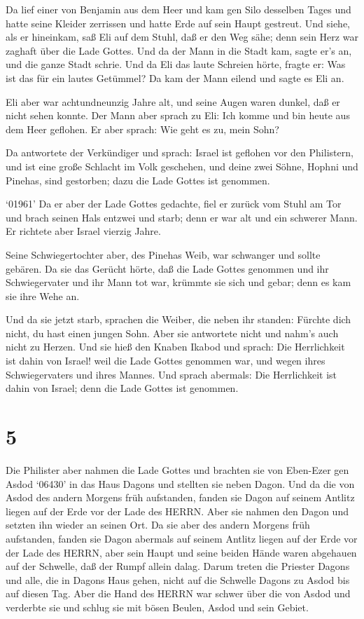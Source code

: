  Da lief einer von Benjamin aus dem Heer und kam gen Silo
desselben Tages und hatte seine Kleider zerrissen und hatte Erde auf
sein Haupt gestreut.  Und siehe, als er hineinkam, saß Eli
auf dem Stuhl, daß er den Weg sähe; denn sein Herz war zaghaft über die
Lade Gottes. Und da der Mann in die Stadt kam, sagte er's an, und die
ganze Stadt schrie.  Und da Eli das laute Schreien hörte,
fragte er: Was ist das für ein lautes Getümmel? Da kam der Mann eilend
und sagte es Eli an.

 Eli aber war achtundneunzig Jahre alt, und seine Augen
waren dunkel, daß er nicht sehen konnte.  Der Mann aber
sprach zu Eli: Ich komme und bin heute aus dem Heer geflohen. Er aber
sprach: Wie geht es zu, mein Sohn?

 Da antwortete der Verkündiger und sprach: Israel ist
geflohen vor den Philistern, und ist eine große Schlacht im Volk
geschehen, und deine zwei Söhne, Hophni und Pinehas, sind gestorben;
dazu die Lade Gottes ist genommen.

 `01961' Da er aber der Lade Gottes gedachte, fiel er
zurück vom Stuhl am Tor und brach seinen Hals entzwei und starb; denn er
war alt und ein schwerer Mann. Er richtete aber Israel vierzig Jahre.

 Seine Schwiegertochter aber, des Pinehas Weib, war
schwanger und sollte gebären. Da sie das Gerücht hörte, daß die Lade
Gottes genommen und ihr Schwiegervater und ihr Mann tot war, krümmte sie
sich und gebar; denn es kam sie ihre Wehe an.

 Und da sie jetzt starb, sprachen die Weiber, die neben ihr
standen: Fürchte dich nicht, du hast einen jungen Sohn. Aber sie
antwortete nicht und nahm's auch nicht zu Herzen.  Und sie
hieß den Knaben Ikabod und sprach: Die Herrlichkeit ist dahin von
Israel! weil die Lade Gottes genommen war, und wegen ihres
Schwiegervaters und ihres Mannes.  Und sprach abermals: Die
Herrlichkeit ist dahin von Israel; denn die Lade Gottes ist genommen.

\hypertarget{section-4}{%
\section{5}\label{section-4}}

 Die Philister aber nahmen die Lade Gottes und brachten sie
von Eben-Ezer gen Asdod  `06430' in das Haus Dagons und
stellten sie neben Dagon.  Und da die von Asdod des andern
Morgens früh aufstanden, fanden sie Dagon auf seinem Antlitz liegen auf
der Erde vor der Lade des HERRN. Aber sie nahmen den Dagon und setzten
ihn wieder an seinen Ort.  Da sie aber des andern Morgens
früh aufstanden, fanden sie Dagon abermals auf seinem Antlitz liegen auf
der Erde vor der Lade des HERRN, aber sein Haupt und seine beiden Hände
waren abgehauen auf der Schwelle, daß der Rumpf allein dalag.
 Darum treten die Priester Dagons und alle, die in Dagons
Haus gehen, nicht auf die Schwelle Dagons zu Asdod bis auf diesen Tag.
 Aber die Hand des HERRN war schwer über die von Asdod und
verderbte sie und schlug sie mit bösen Beulen, Asdod und sein Gebiet.

